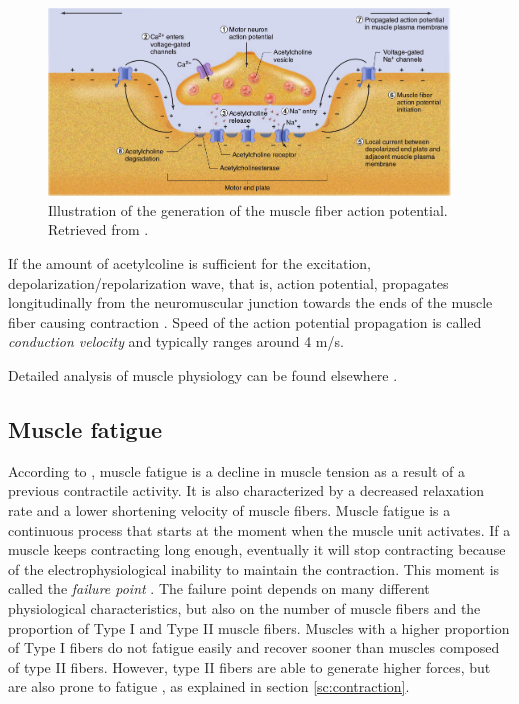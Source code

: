 \begin{figure}[ht]
\centering
\includegraphics[width=0.95\textwidth]{Images/introduction/action_potential_generation.png}
\caption{Illustration of the generation of the muscle fiber action potential. Retrieved from \citet{Widmaier2014}.}
\label{fig:action_potential_generation}
\end{figure}
  
If the amount of acetylcoline is sufficient for the excitation, depolarization/repolarization wave, that is, action potential, propagates longitudinally from the neuromuscular junction towards the ends of the muscle fiber causing contraction \citep{Henneberg1999}. Speed of the action potential propagation is called \emph{conduction velocity} and typically ranges around 4 m/s.

Detailed analysis of muscle physiology can be found elsewhere \citep{Squire1986, Widmaier2014}.



\subsection{Muscle fatigue} \label{sc:fatigue}

According to \citet{Widmaier2014}, muscle fatigue is a decline in muscle tension as a result of a previous contractile activity. It is also characterized by a decreased relaxation rate and a lower shortening velocity of muscle fibers. Muscle fatigue is a continuous process that starts at the moment when the muscle unit activates. If a muscle keeps contracting long enough, eventually it will stop contracting because of the electrophysiological inability to maintain the contraction. This moment is called the \emph{failure point} \citep{DeLuca1984}. The failure point depends on many different physiological characteristics, but also on the number of muscle fibers and the proportion of Type I and Type II muscle fibers. Muscles with a higher proportion of Type I fibers do not fatigue easily and recover sooner than muscles composed of type II fibers. However, type II fibers are able to generate higher forces, but are also prone to fatigue \citep{Kupa1995}, as explained in section \ref{sc:contraction}.

